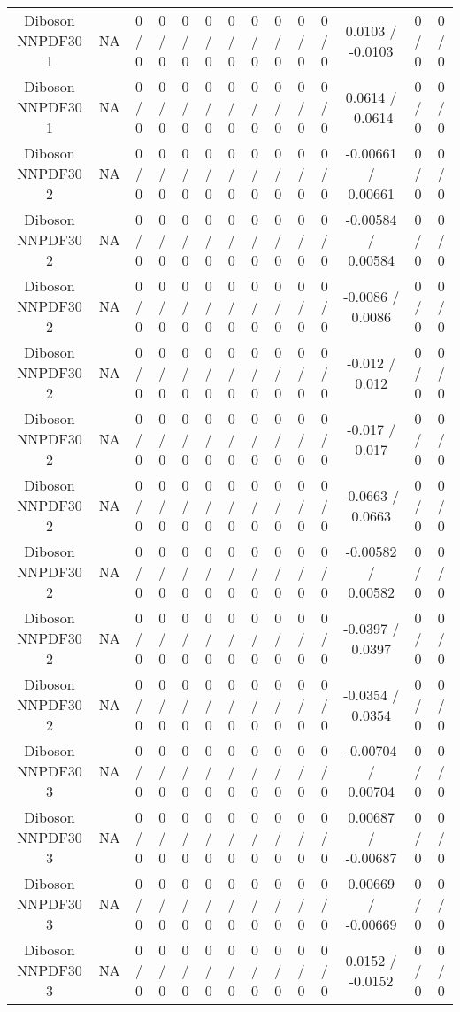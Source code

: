 \documentclass[10pt]{article}
\begin{document}
\begin{table}[htbp]
\begin{center}
\begin{tabular}{|c|c|c|c|c|c|c|c|c|c|c|c|c|c|}
  Diboson NNPDF30 1 &    NA    & 0 / 0 & 0 / 0 & 0 / 0 & 0 / 0 & 0 / 0 & 0 / 0 & 0 / 0 & 0 / 0 & 0 / 0 & 0.0103 / -0.0103 & 0 / 0 & 0 / 0 \\ 
  Diboson NNPDF30 1 &    NA    & 0 / 0 & 0 / 0 & 0 / 0 & 0 / 0 & 0 / 0 & 0 / 0 & 0 / 0 & 0 / 0 & 0 / 0 & 0.0614 / -0.0614 & 0 / 0 & 0 / 0 \\ 
  Diboson NNPDF30 2 &    NA    & 0 / 0 & 0 / 0 & 0 / 0 & 0 / 0 & 0 / 0 & 0 / 0 & 0 / 0 & 0 / 0 & 0 / 0 & -0.00661 / 0.00661 & 0 / 0 & 0 / 0 \\ 
  Diboson NNPDF30 2 &    NA    & 0 / 0 & 0 / 0 & 0 / 0 & 0 / 0 & 0 / 0 & 0 / 0 & 0 / 0 & 0 / 0 & 0 / 0 & -0.00584 / 0.00584 & 0 / 0 & 0 / 0 \\ 
  Diboson NNPDF30 2 &    NA    & 0 / 0 & 0 / 0 & 0 / 0 & 0 / 0 & 0 / 0 & 0 / 0 & 0 / 0 & 0 / 0 & 0 / 0 & -0.0086 / 0.0086 & 0 / 0 & 0 / 0 \\ 
  Diboson NNPDF30 2 &    NA    & 0 / 0 & 0 / 0 & 0 / 0 & 0 / 0 & 0 / 0 & 0 / 0 & 0 / 0 & 0 / 0 & 0 / 0 & -0.012 / 0.012 & 0 / 0 & 0 / 0 \\ 
  Diboson NNPDF30 2 &    NA    & 0 / 0 & 0 / 0 & 0 / 0 & 0 / 0 & 0 / 0 & 0 / 0 & 0 / 0 & 0 / 0 & 0 / 0 & -0.017 / 0.017 & 0 / 0 & 0 / 0 \\ 
  Diboson NNPDF30 2 &    NA    & 0 / 0 & 0 / 0 & 0 / 0 & 0 / 0 & 0 / 0 & 0 / 0 & 0 / 0 & 0 / 0 & 0 / 0 & -0.0663 / 0.0663 & 0 / 0 & 0 / 0 \\ 
  Diboson NNPDF30 2 &    NA    & 0 / 0 & 0 / 0 & 0 / 0 & 0 / 0 & 0 / 0 & 0 / 0 & 0 / 0 & 0 / 0 & 0 / 0 & -0.00582 / 0.00582 & 0 / 0 & 0 / 0 \\ 
  Diboson NNPDF30 2 &    NA    & 0 / 0 & 0 / 0 & 0 / 0 & 0 / 0 & 0 / 0 & 0 / 0 & 0 / 0 & 0 / 0 & 0 / 0 & -0.0397 / 0.0397 & 0 / 0 & 0 / 0 \\ 
  Diboson NNPDF30 2 &    NA    & 0 / 0 & 0 / 0 & 0 / 0 & 0 / 0 & 0 / 0 & 0 / 0 & 0 / 0 & 0 / 0 & 0 / 0 & -0.0354 / 0.0354 & 0 / 0 & 0 / 0 \\ 
  Diboson NNPDF30 3 &    NA    & 0 / 0 & 0 / 0 & 0 / 0 & 0 / 0 & 0 / 0 & 0 / 0 & 0 / 0 & 0 / 0 & 0 / 0 & -0.00704 / 0.00704 & 0 / 0 & 0 / 0 \\ 
  Diboson NNPDF30 3 &    NA    & 0 / 0 & 0 / 0 & 0 / 0 & 0 / 0 & 0 / 0 & 0 / 0 & 0 / 0 & 0 / 0 & 0 / 0 & 0.00687 / -0.00687 & 0 / 0 & 0 / 0 \\ 
  Diboson NNPDF30 3 &    NA    & 0 / 0 & 0 / 0 & 0 / 0 & 0 / 0 & 0 / 0 & 0 / 0 & 0 / 0 & 0 / 0 & 0 / 0 & 0.00669 / -0.00669 & 0 / 0 & 0 / 0 \\ 
  Diboson NNPDF30 3 &    NA    & 0 / 0 & 0 / 0 & 0 / 0 & 0 / 0 & 0 / 0 & 0 / 0 & 0 / 0 & 0 / 0 & 0 / 0 & 0.0152 / -0.0152 & 0 / 0 & 0 / 0 \\ 

\end{tabular}
\end{center}
\end{table}
\end{document}
